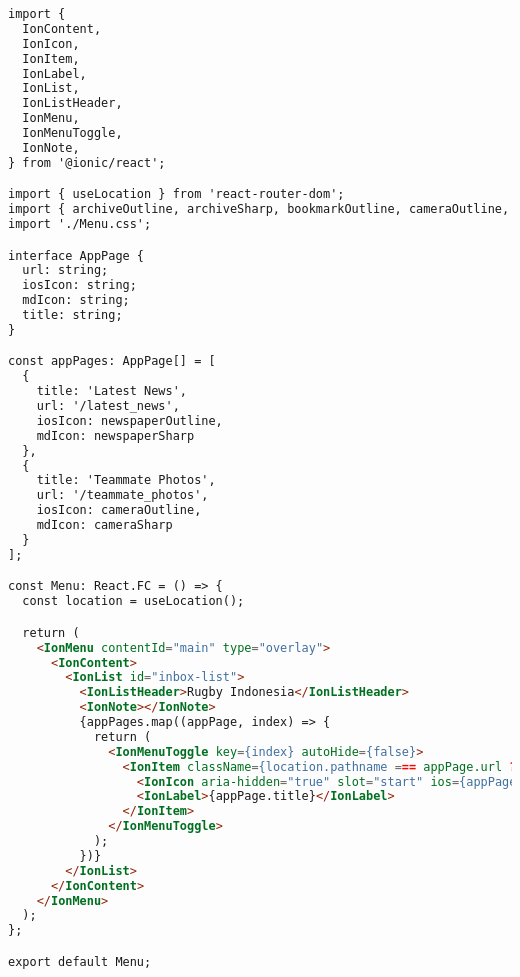 \begin{lstlisting}[language=HTML, caption=Menu.tsx]
import {
  IonContent,
  IonIcon,
  IonItem,
  IonLabel,
  IonList,
  IonListHeader,
  IonMenu,
  IonMenuToggle,
  IonNote,
} from '@ionic/react';

import { useLocation } from 'react-router-dom';
import { archiveOutline, archiveSharp, bookmarkOutline, cameraOutline, cameraSharp, heartOutline, heartSharp, mailOutline, mailSharp, newspaper, newspaperOutline, newspaperSharp, paperPlaneOutline, paperPlaneSharp, trashOutline, trashSharp, warningOutline, warningSharp } from 'ionicons/icons';
import './Menu.css';

interface AppPage {
  url: string;
  iosIcon: string;
  mdIcon: string;
  title: string;
}

const appPages: AppPage[] = [
  {
    title: 'Latest News',
    url: '/latest_news',
    iosIcon: newspaperOutline,
    mdIcon: newspaperSharp
  },
  {
    title: 'Teammate Photos',
    url: '/teammate_photos',
    iosIcon: cameraOutline,
    mdIcon: cameraSharp
  }
];

const Menu: React.FC = () => {
  const location = useLocation();

  return (
    <IonMenu contentId="main" type="overlay">
      <IonContent>
        <IonList id="inbox-list">
          <IonListHeader>Rugby Indonesia</IonListHeader>
          <IonNote></IonNote>
          {appPages.map((appPage, index) => {
            return (
              <IonMenuToggle key={index} autoHide={false}>
                <IonItem className={location.pathname === appPage.url ? 'selected' : ''} routerLink={appPage.url} routerDirection="none" lines="none" detail={false}>
                  <IonIcon aria-hidden="true" slot="start" ios={appPage.iosIcon} md={appPage.mdIcon} />
                  <IonLabel>{appPage.title}</IonLabel>
                </IonItem>
              </IonMenuToggle>
            );
          })}
        </IonList>
      </IonContent>
    </IonMenu>
  );
};

export default Menu;

\end{lstlisting}

